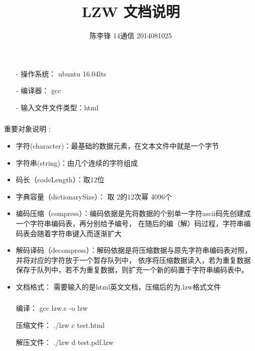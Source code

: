 \documentclass[11pt]{ctexart} %
\title{\centering \LARGE{LZW 文档说明}\\%
} %
\author{\textsc {陈李锋 14通信 2014081025 } }
\begin{document}
\maketitle %

\subsubsection*{}
\paragraph{}
\begin{itemize}
\item[-] 操作系统： ubuntu 16.04lts
\item[-] 编译器： gcc
\item[-] 输入文件文件类型：html
\end{itemize}

\subsubsection*{}
重要对象说明 :
\begin{itemize} 
\item 字符(character)：最基础的数据元素，在文本文件中就是一个字节 
\item 字符串(string)：由几个连续的字符组成
\item 码长（codeLength）：取12位
\item 字典容量（dictionarySize）： 取 2的12次幂 4096个
\item 编码压缩（compress）：编码依据是先将数据的个别单一字符ascii码先创建成一个字符串编码表，再分别给予编号，
在随后的编（解）码过程，字符串编码表会随着字符串键入而逐渐扩大
\item 解码译码（decompress）：解码依据是将压缩数据与原先字符串编码表对照，并将对应的字符放于一个暂存队列中，
依序将压缩数据读入，若为重复数据保存于队列中，若不为重复数据，则扩充一个新的码置于字符串编码表中。
\item 文档格式： 需要输入的是html英文文档，压缩后的为.lzw格式文件
\end{itemize}

\subsubsection*{}
\begin{itemize} 
\item[] 编译： gcc lzw.c -o lzw
\item[] 压缩文件： ./lzw c test.html 
\item[] 解压文件： ./lzw d test.pdf.lzw 
\end{itemize}
\end{document}
